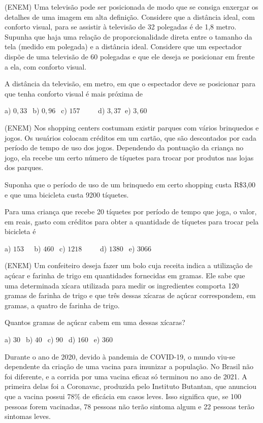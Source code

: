 \begin{multicols*}{2}
		\setcounter{numexercicio}{0}
		\execnum (ENEM) Uma televisão pode ser posicionada de modo que se consiga enxergar os detalhes de uma imagem em alta definição. Considere que a distância ideal, com conforto visual, para se assistir à televisão de 32 polegadas
		      é de 1,8 metro. Supunha que haja uma relação de proporcionalidade direta entre o tamanho da tela (medido
		      em polegada) e a distância ideal. Considere que um espectador dispõe de uma televisão de 60 polegadas e que
		      ele deseja se posicionar em frente a ela, com conforto visual.

		      A distância da televisão, em metro, em que o espectador deve se posicionar para que tenha conforto visual é mais
		      próxima de

		      a) $0,33 \ \ $ b) $0,96 \ \ $ c) $157 \ \ \ \ \ \ \ \ \ \ $ d) $3,37 \ $ e) $3,60 \ \ $

		\execnum (ENEM) Nos shopping centers costumam existir parques com vários brinquedos e jogos. Os usuários
		      colocam créditos em um cartão, que são descontados por cada período de tempo de uso dos jogos. Dependendo da
		      pontuação da criança no jogo, ela recebe um certo número de tíquetes para trocar por produtos nas lojas dos parques.

		      Suponha que o período de uso de um brinquedo em certo shopping custa R\$3,00 e que uma bicicleta custa 9200 tíquetes.

		      Para uma criança que recebe 20 tíquetes por período de tempo que joga, o valor, em reais, gasto com créditos para
		      obter a quantidade de tíquetes para trocar pela bicicleta é

		      a) $153 \ \ \ \ \ $ b) $460 \ \ $ c) $1218 \ \ \ \ \ \ \ \ \ \ $ d) $1380 \ \ $ e) $3066 \ \ $

		\execnum (ENEM) Um confeiteiro deseja fazer um bolo cuja receita indica a utilização de açúcar e farinha de trigo em
		      quantidades fornecidas em gramas. Ele sabe que uma determinada xícara utilizada para medir os ingredientes
		      comporta 120 gramas de farinha de trigo e que três dessas xícaras de açúcar correspondem, em gramas, a quatro de
		      farinha de trigo.

		      Quantos gramas de açúcar cabem em uma dessas xícaras?

		      a) $30 \ \ $ b) $40 \ \ $ c) $90 \ \ $ d) $160 \ \ $ e) $360 \ \ $

		\execnum Durante o ano de 2020, devido à pandemia de COVID-19, o mundo viu-se dependente da criação de uma vacina para imunizar a população. No Brasil não foi diferente, e a corrida por uma vacina eficaz só terminou no ano de 2021. A primeira delas foi a Coronavac, produzida pelo Instituto Butantan, que anunciou que a vacina possui 78\% de eficácia em casos leves. Isso significa que, se 100 pessoas forem vacinadas, 78 pessoas não terão sintoma algum e 22 pessoas terão sintomas leves.


\end{multicols*}
